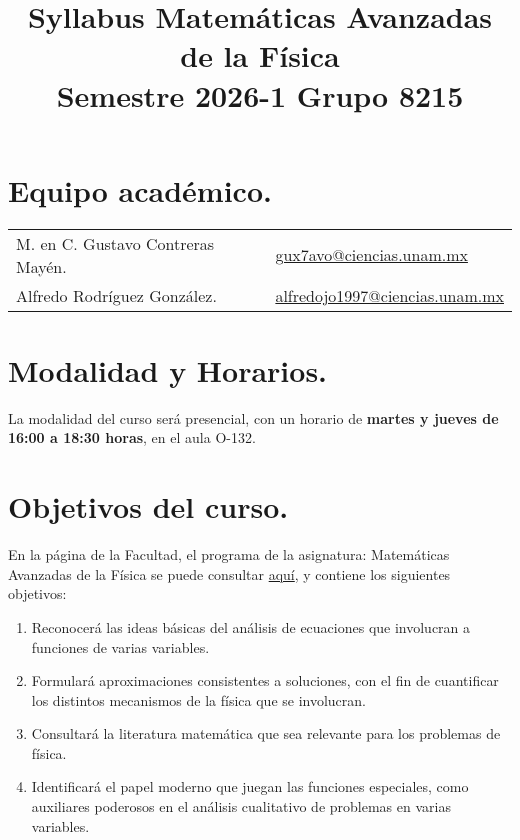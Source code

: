 \documentclass[12pt]{article}
\title{Syllabus Matemáticas Avanzadas de la Física \\ \large{Semestre 2026-1 \hspace{3cm} Grupo 8215}\vspace{-3ex}}
\author{}
\date{ }
\numberwithin{equation}{section}
\begin{document}
\maketitle
\vspace{-2.5cm}

\section{Equipo académico.}

\begin{table}[H]
\renewcommand{\arraystretch}{1.2}
\begin{tabular}{l l}
M. en C. Gustavo Contreras Mayén. & \href{mailto:gux7avo@ciencias.unam.mx}{gux7avo@ciencias.unam.mx} \\
Alfredo Rodríguez González. & \href{mailto:alfredojo1997@ciencias.unam.mx}{alfredojo1997@ciencias.unam.mx}
\end{tabular}
\end{table}

\section{Modalidad y Horarios.}

La modalidad del curso será presencial, con un horario de \textbf{martes y jueves de 16:00 a 18:30 horas}, en el aula O-132.

\section{Objetivos del curso.}

En la página de la Facultad, el programa de la asignatura: Matemáticas Avanzadas de la Física se puede consultar 
\href{https://www.fciencias.unam.mx/sites/default/files/temario/610.pdf}{aquí}, y contiene los siguientes objetivos:
\begin{enumerate}
\item Reconocerá las ideas básicas del análisis de ecuaciones que involucran a funciones de varias variables.
\item Formulará aproximaciones consistentes a soluciones, con el fin de cuantificar los distintos mecanismos de la física que se involucran.
\item Consultará la literatura matemática que sea relevante para los problemas de física.
\item Identificará el papel moderno que juegan las funciones especiales, como auxiliares poderosos en el análisis cualitativo de problemas en varias variables.
\end{enumerate}
\end{document}
